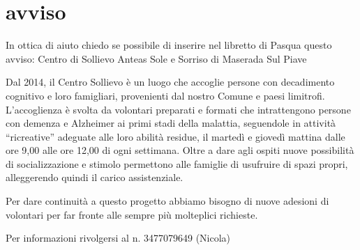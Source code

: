 \section{avviso}

In ottica di aiuto chiedo se possibile di inserire nel libretto di Pasqua questo avviso: 
Centro di Sollievo Anteas Sole e Sorriso
di Maserada Sul Piave


Dal 2014, il Centro Sollievo è un luogo che accoglie persone con decadimento cognitivo e loro famigliari, provenienti dal nostro Comune e paesi limitrofi. L’accoglienza è svolta da volontari preparati e formati che intrattengono persone con demenza e Alzheimer ai primi stadi della malattia, seguendole in attività “ricreative” adeguate alle loro abilità residue, il martedì e giovedì mattina dalle ore 9,00 alle ore 12,00 di ogni settimana. Oltre a dare agli ospiti nuove possibilità di socializzazione e stimolo permettono alle famiglie di usufruire di spazi propri, alleggerendo quindi il carico assistenziale.

Per dare continuità a questo progetto abbiamo bisogno di nuove adesioni di volontari per far fronte alle sempre più molteplici richieste.

Per informazioni rivolgersi al n. 3477079649 (Nicola)

